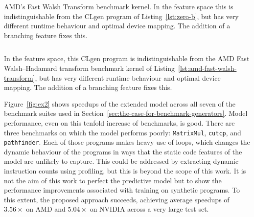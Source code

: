 \begin{listing}
  \inputminted{opencl_lexer.py:OpenCLLexer -x}{lst/amd-fast-walsh-transform.cl}
  \caption[AMD's Fast Walsh Transform kernel]{AMD's Fast Walsh Transform benchmark kernel. In the \citeauthor{Grewe2013} feature space this is indistinguishable from the CLgen program of Listing~\ref{lst:zero-b}, but has very different runtime behaviour and optimal device mapping. The addition of a branching feature fixes this.}
  \label{lst:amd-fast-walsh-transform}
\end{listing}

\begin{listing}
  \inputminted{opencl_lexer.py:OpenCLLexer -x}{lst/amd-fast-walsh-transform-equivalent.cl}
  \caption[Synthesised program with same features as an AMD benchmark]{In the \citeauthor{Grewe2013} feature space, this CLgen program is indistinguishable from the AMD Fast Walsh–Hadamard transform benchmark kernel of Listing~\ref{lst:amd-fast-walsh-transform}, but has very different runtime behaviour and optimal device mapping. The addition of a branching feature fixes this.}
  \label{lst:zero-b}
\end{listing}

Figure~\ref{fig:ex2} shows speedups of the extended model across all seven of the benchmark suites used in Section~\ref{sec:the-case-for-benchmark-generators}. Model performance, even on this tenfold increase of benchmarks, is good. There are three benchmarks on which the model performs poorly: \texttt{MatrixMul}, \texttt{cutcp}, and \texttt{pathfinder}. Each of those programs makes heavy use of loops, which changes the dynamic behaviour of the programs in ways that the static code features of the model are unlikely to capture. This could be addressed by extracting dynamic instruction counts using profiling, but this is beyond the scope of this work. It is not the aim of this work to perfect the predictive model but to show the performance improvements associated with training on synthetic programs. To this extent, the proposed approach succeeds, achieving average speedups of $3.56\times$ on AMD and $5.04\times$ on NVIDIA across a very large test set.


